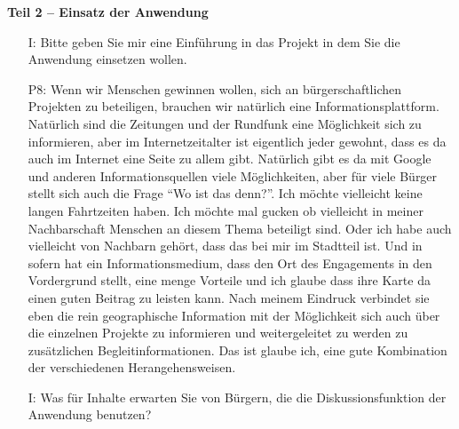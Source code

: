 \textbf{Teil 2 -- Einsatz der Anwendung}
\begin{itemize}
    \item[I:] Bitte geben Sie mir eine Einf{\"u}hrung in das Projekt in dem Sie die Anwendung einsetzen wollen.
    \item[P8:] Wenn wir Menschen gewinnen wollen, sich an b{\"u}rgerschaftlichen Projekten zu beteiligen, brauchen wir nat{\"u}rlich eine Informationsplattform. Nat{\"u}rlich sind die Zeitungen und der Rundfunk eine M{\"o}glichkeit sich zu informieren, aber im Internetzeitalter ist eigentlich jeder gewohnt, dass es da auch im Internet eine Seite zu allem gibt. Nat{\"u}rlich gibt es da mit Google und anderen Informationsquellen viele M{\"o}glichkeiten, aber f{\"u}r viele B{\"u}rger stellt sich auch die Frage "`Wo ist das denn?"'. Ich m{\"o}chte vielleicht keine langen Fahrtzeiten haben. Ich m{\"o}chte mal gucken ob vielleicht in meiner Nachbarschaft Menschen an diesem Thema beteiligt sind. Oder ich habe auch vielleicht von Nachbarn geh{\"o}rt, dass das bei mir im Stadtteil ist. Und in sofern hat ein Informationsmedium, dass den Ort des Engagements in den Vordergrund stellt, eine menge Vorteile und ich glaube dass ihre Karte da einen guten Beitrag zu leisten kann. Nach meinem Eindruck verbindet sie eben die rein geographische Information mit der M{\"o}glichkeit sich auch {\"u}ber die einzelnen Projekte zu informieren und weitergeleitet zu werden zu zus{\"a}tzlichen Begleitinformationen. Das ist glaube ich, eine gute Kombination der verschiedenen Herangehensweisen.
    \item[I:] Was f{\"u}r Inhalte erwarten Sie von B{\"u}rgern, die die Diskussionsfunktion der Anwendung benutzen?

\end{itemize}
